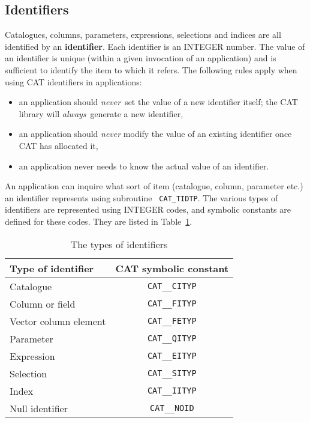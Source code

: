 \subsection{Identifiers}

Catalogues, columns, parameters, expressions, selections and indices are
all identified by an {\bf identifier}. Each identifier is an INTEGER 
number. The value of an identifier is unique (within a given invocation of
an application) and is sufficient to identify the item to which it refers. 
The following rules apply when using CAT identifiers in applications:

\begin{itemize}

  \item an application should {\it never}\, set the value of a new 
   identifier itself; the CAT library will {\it always}\, generate a 
   new identifier,

  \item an application should {\it never} modify the value of an
   existing identifier once CAT has allocated it,

  \item an application never needs to know the actual value of an
   identifier.

\end{itemize}

An application can inquire what sort of item (catalogue, column,
parameter etc.) an identifier represents using subroutine {\tt 
CAT\_TIDTP}. The various types of identifiers are represented using 
INTEGER codes, and symbolic constants are defined for these codes. They 
are listed in Table~\ref{IDTYPE}.

\begin{table}[htbp]

\begin{center}
\begin{tabular}{lc}
Type of identifier        &  CAT symbolic constant \\ \hline
Catalogue                 &  {\tt CAT\_\_CITYP}   \\
Column or field           &  {\tt CAT\_\_FITYP}   \\
Vector column element     &  {\tt CAT\_\_FETYP}   \\
Parameter                 &  {\tt CAT\_\_QITYP}   \\
Expression                &  {\tt CAT\_\_EITYP}   \\
Selection                 &  {\tt CAT\_\_SITYP}   \\
Index                     &  {\tt CAT\_\_IITYP}   \\
Null identifier           &  {\tt CAT\_\_NOID}   \\
\end{tabular}
\end{center}

\caption{\label{IDTYPE}The types of identifiers}

\end{table}

